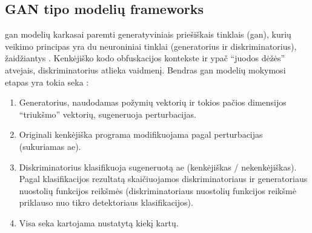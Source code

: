 \subsection{GAN tipo modelių \glspl{framework}}\label{sec:literature:gan}

\gls{gan} modelių karkasai paremti generatyviniais priešiškais tinklais (\gls{gan}), kurių veikimo principas yra du neuroniniai tinklai (generatorius ir diskriminatorius), žaidžiantys  \cite{chenInfoGANInterpretableRepresentation2016a}. Kenkėjiško kodo obfuskacijos kontekste ir ypač \enquote{juodos dėžės} atvejais, diskriminatorius atlieka  vaidmenį. Bendras \gls{gan} modelių mokymosi etapas yra tokia seka \cite{huGeneratingAdversarialMalware2017,zhuNgramMalGANEvading2022,zhongMalFoxCamouflagedAdversarial2024}:
\begin{enumerate}
    \item Generatorius, naudodamas požymių vektorių ir tokios pačios dimensijos
          \enquote{triukšmo}  vektorių, sugeneruoja perturbacijas.
    \item Originali kenkėjiška programa modifikuojama pagal perturbacijas (sukuriamas
          \gls{ae}).
    \item Diskriminatorius klasifikuoja sugeneruotą \gls{ae} (kenkėjiškas /
          nekenkėjiškas). Pagal klasifikacijos rezultatą skaičiuojamos diskriminatoriaus
          ir generatoriaus nuostolių funkcijos reikšmės (diskriminatoriaus nuostolių
          funkcijos reikšmė priklauso nuo tikro detektoriaus klasifikacijos).
    \item Visa seka kartojama nustatytą kiekį kartų.
\end{enumerate}

